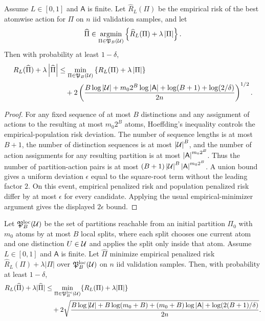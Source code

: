\begin{theorem}
\label{thm:oracle-refinement:informal}
Assume $L\in[0,1]$ and $\mathsf A$ is finite. Let $\widehat R_L(\Pi)$ be the empirical risk of the best atomwise action for $\Pi$ on $n$ iid validation samples, and let
\begin{align*}
\widehat\Pi\in
\operatorname*{argmin}_{\Pi\in\mathfrak P_B(\mathcal{U})}
\left\{
\widehat R_L(\Pi)+\lambda\left\lvert\Pi\right\rvert
\right\}.
\end{align*}
Then with probability at least $1-\delta$,
\begin{align*}
R_L(\widehat\Pi)+\lambda\left\lvert\widehat\Pi\right\rvert
&\le
\min_{\Pi\in\mathfrak P_B(\mathcal{U})}
\left\{
R_L(\Pi)+\lambda\left\lvert\Pi\right\rvert
\right\}
\\
&\quad
+2\left(
\frac{
B\log\left\lvert\mathcal{U}\right\rvert
+m_0 2^B\log\left\lvert\mathsf A\right\rvert
+\log(B+1)
+\log(2/\delta)}
{2n}
\right)^{1/2}.
\end{align*}
\end{theorem}

\begin{proof}
For any fixed sequence of at most $B$ distinctions and any assignment of actions to the resulting at most $m_0 2^B$ atoms, Hoeffding's inequality controls the empirical-population risk deviation. The number of sequence lengths is at most $B+1$, the number of distinction sequences is at most $\left\lvert\mathcal{U}\right\rvert^B$, and the number of action assignments for any resulting partition is at most $\left\lvert\mathsf A\right\rvert^{m_0 2^B}$. Thus the number of partition-action pairs is at most $(B+1)\left\lvert\mathcal{U}\right\rvert^B\left\lvert\mathsf A\right\rvert^{m_0 2^B}$. A union bound gives a uniform deviation $\epsilon$ equal to the square-root term without the leading factor $2$. On this event, empirical penalized risk and population penalized risk differ by at most $\epsilon$ for every candidate. Applying the usual empirical-minimizer argument gives the displayed $2\epsilon$ bound.
\end{proof}

\begin{theorem}
\label{thm:local-oracle-refinement:informal}
Let $\mathfrak P_B^{\mathrm{loc}}(\mathcal{U})$ be the set of partitions reachable from an initial partition $\Pi_0$ with $m_0$ atoms by at most $B$ local splits, where each split chooses one current atom and one distinction $U\in\mathcal{U}$ and applies the split only inside that atom. Assume $L\in[0,1]$ and $\mathsf A$ is finite. Let $\widehat\Pi$ minimize empirical penalized risk $\widehat R_L(\Pi)+\lambda|\Pi|$ over $\mathfrak P_B^{\mathrm{loc}}(\mathcal{U})$ on $n$ iid validation samples. Then, with probability at least $1-\delta$,
\begin{align*}
R_L(\widehat \Pi)+\lambda |\widehat \Pi|
&\le
\min_{\Pi\in\mathfrak P_B^{\mathrm{loc}}(\mathcal{U})}
\{R_L(\Pi)+\lambda|\Pi|\} \\
&\quad+
2\sqrt{
\frac{
B\log|\mathcal{U}|
+
B\log(m_0+B)
+
(m_0+B)\log|\mathsf A|
+
\log(2(B+1)/\delta)
}{2n}
}.
\end{align*}
\end{theorem}

